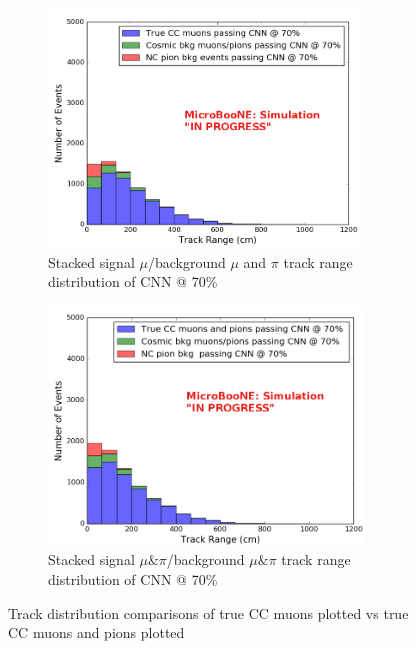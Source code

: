 \begin{figure}[htp!]
\centering
	\begin{subfigure}[b]{.45\textwidth}
	\includegraphics[width=\textwidth,height=2.5in]{figs/sel1mod_cnn_trackrange_mupi_acc70_0707.png}
	\caption{Stacked signal $\mu$/background $\mu$ and $\pi$ track range distribution of CNN @ 70\%}
	\end{subfigure}
	\quad
	\begin{subfigure}[b]{.45\textwidth}
	\includegraphics[width=\textwidth,height=2.5in]{figs/sel1mod_mupi_trackrange_acc70.png}
	\caption{Stacked signal $\mu \& \pi$/background $\mu \& \pi$ track range distribution of CNN @ 70\%}
	\end{subfigure}
	\quad
\caption{Track distribution comparisons of true CC muons plotted vs true CC muons and pions plotted}
\label{fig:mupi}
\end{figure}


